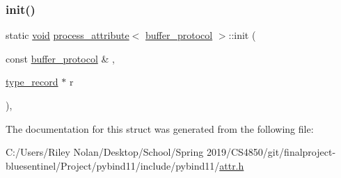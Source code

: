 \subsubsection{\texorpdfstring{init()}{init()}}
{\footnotesize\ttfamily static \mbox{\hyperlink{_s_d_l__opengles2__gl2ext_8h_ae5d8fa23ad07c48bb609509eae494c95}{void}} \mbox{\hyperlink{structprocess__attribute}{process\+\_\+attribute}}$<$ \mbox{\hyperlink{structbuffer__protocol}{buffer\+\_\+protocol}} $>$\+::init (\begin{DoxyParamCaption}\item[{const \mbox{\hyperlink{structbuffer__protocol}{buffer\+\_\+protocol}} \&}]{,  }\item[{\mbox{\hyperlink{structtype__record}{type\+\_\+record}} $\ast$}]{r }\end{DoxyParamCaption})\hspace{0.3cm}{\ttfamily [inline]}, {\ttfamily [static]}}



The documentation for this struct was generated from the following file\+:\begin{DoxyCompactItemize}
\item 
C\+:/\+Users/\+Riley Nolan/\+Desktop/\+School/\+Spring 2019/\+C\+S4850/git/finalproject-\/bluesentinel/\+Project/pybind11/include/pybind11/\mbox{\hyperlink{attr_8h}{attr.\+h}}\end{DoxyCompactItemize}
